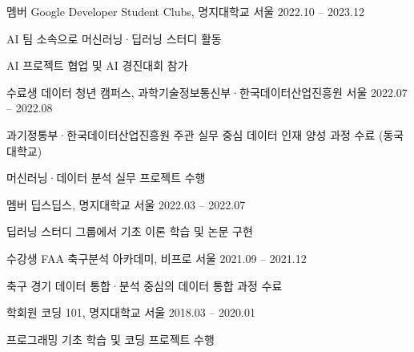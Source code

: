 \documentclass[11pt, a4paper]{awesome-cv}
\let\origcvsubsection\cvsubsection
\renewcommand{\cvsubsection}[1]{\needspace{5\baselineskip}\origcvsubsection{#1}}
\begin{document}
\begin{cventries}
\cventry
    {멤버}
    {Google Developer Student Clubs, 명지대학교}
    {서울}
    {2022.10 -- 2023.12}
    {
      \begin{cvitems}
        \item {AI 팀 소속으로 머신러닝·딥러닝 스터디 활동}
        \item {AI 프로젝트 협업 및 AI 경진대회 참가}
      \end{cvitems}
    }
\vspace{-1mm}
\cventry
    {수료생}
    {데이터 청년 캠퍼스, 과학기술정보통신부·한국데이터산업진흥원}
    {서울}
    {2022.07 -- 2022.08}
    {
      \begin{cvitems}
        \item {과기정통부·한국데이터산업진흥원 주관 실무 중심 데이터 인재 양성 과정 수료 (동국대학교)}
        \item {머신러닝·데이터 분석 실무 프로젝트 수행}
      \end{cvitems}
    }
\vspace{-1mm}
\cventry
    {멤버}
    {딥스딥스, 명지대학교}
    {서울}
    {2022.03 -- 2022.07}
    {
      \begin{cvitems}
        \item {딥러닝 스터디 그룹에서 기초 이론 학습 및 논문 구현}
      \end{cvitems}
    }
\vspace{-1mm}
\cventry
    {수강생}
    {FAA 축구분석 아카데미, 비프로}
    {서울}
    {2021.09 -- 2021.12}
    {
      \begin{cvitems}
        \item {축구 경기 데이터 통합·분석 중심의 데이터 통합 과정 수료}
      \end{cvitems}
    }
\vspace{-1mm}
\cventry
    {학회원}
    {코딩 101, 명지대학교}
    {서울}
    {2018.03 -- 2020.01}
    {
      \begin{cvitems}
        \item {프로그래밍 기초 학습 및 코딩 프로젝트 수행}
      \end{cvitems}
    }
\end{cventries}

\end{document}
